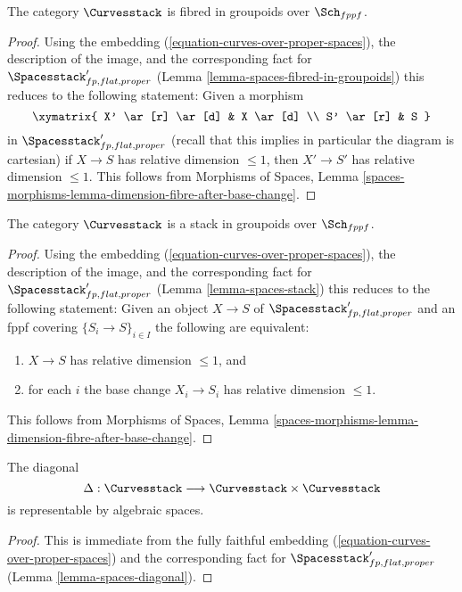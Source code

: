 \begin{lemma}
\label{lemma-curves-fibred-in-groupoids}
The category $\Curvesstack$ is fibred in groupoids over $\Sch_{fppf}$.
\end{lemma}

\begin{proof}
Using the embedding (\ref{equation-curves-over-proper-spaces}),
the description of the image, and
the corresponding fact for $\Spacesstack'_{fp, flat, proper}$
(Lemma \ref{lemma-spaces-fibred-in-groupoids})
this reduces to the following statement: Given a morphism
$$
\xymatrix{
X' \ar[r] \ar[d] & X \ar[d] \\
S' \ar[r] & S
}
$$
in $\Spacesstack'_{fp, flat, proper}$ (recall that this implies
in particular the diagram is cartesian)
if $X \to S$ has relative dimension $\leq 1$, then $X' \to S'$
has relative dimension $\leq 1$.
This follows from Morphisms of Spaces, Lemma
\ref{spaces-morphisms-lemma-dimension-fibre-after-base-change}.
\end{proof}

\begin{lemma}
\label{lemma-curves-stack}
The category $\Curvesstack$ is a stack in groupoids over $\Sch_{fppf}$.
\end{lemma}

\begin{proof}
Using the embedding (\ref{equation-curves-over-proper-spaces}),
the description of the image, and
the corresponding fact for $\Spacesstack'_{fp, flat, proper}$
(Lemma \ref{lemma-spaces-stack})
this reduces to the following statement: Given an object
$X \to S$ of $\Spacesstack'_{fp, flat, proper}$
and an fppf covering $\{S_i \to S\}_{i \in I}$
the following are equivalent:
\begin{enumerate}
\item $X \to S$ has relative dimension $\leq 1$, and
\item for each $i$ the base change $X_i \to S_i$
has relative dimension $\leq 1$.
\end{enumerate}
This follows from Morphisms of Spaces, Lemma
\ref{spaces-morphisms-lemma-dimension-fibre-after-base-change}.
\end{proof}

\begin{lemma}
\label{lemma-curves-diagonal}
The diagonal
$$
\Delta : \Curvesstack \longrightarrow \Curvesstack \times \Curvesstack
$$
is representable by algebraic spaces.
\end{lemma}

\begin{proof}
This is immediate from the fully faithful embedding
(\ref{equation-curves-over-proper-spaces}) and
the corresponding fact for $\Spacesstack'_{fp, flat, proper}$
(Lemma \ref{lemma-spaces-diagonal}).
\end{proof}


